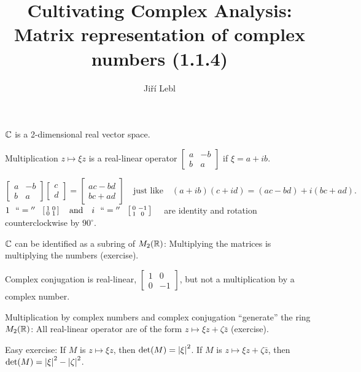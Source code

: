 \documentclass[10pt,aspectratio=169]{beamer}
\author{Ji\v{r}\'i Lebl}
\institute[OSU]{%
Departemento pri Matematiko de Oklahoma {\^S}tata Universitato}
\title{Cultivating Complex Analysis:\\%
Matrix representation of complex numbers (1.1.4)}
\date{}
\begin{document}
\begin{frame}
\titlepage
\end{frame}

\begin{frame}
${\mathbb{C}}$ is a 2-dimensional real vector space.

\pause
\medskip

Multiplication $z \mapsto \xi z$ is a real-linear operator
\(
\left[
\begin{smallmatrix}
a & -b \\
b & a
\end{smallmatrix}
\right]
\) if $\xi = a+ib$.

\pause
\[
\begin{bmatrix}
a & -b \\
b & a
\end{bmatrix}
\begin{bmatrix}
c \\
d 
\end{bmatrix}
=
\begin{bmatrix}
ac-bd \\
bc+ad
\end{bmatrix}
\quad
\text{just like}
\quad
(a+ib)(c+id) = (ac-bd) + i(bc+ad) .
\]
\pause
\medskip
$
1 ~~ ``{}={}'' ~~
\left[
\begin{smallmatrix}
1 & 0 \\
0 & 1
\end{smallmatrix}
\right]
\quad \text{and} \quad
i ~~ ``{}={}'' ~~ \left[
\begin{smallmatrix}
0 & -1 \\
1 & 0
\end{smallmatrix} 
\right]
\quad
$
are identity and rotation counterclockwise by $90^{\circ}$.

\pause
\medskip

${\mathbb{C}}$ can be identified as a subring of $M_2({\mathbb{R}})$: Multiplying the matrices
is multiplying the numbers (exercise).

\medskip
\pause

Complex conjugation is real-linear,
$\left[ \begin{smallmatrix} 1 & 0 \\ 0 &
-1 \end{smallmatrix} \right]$,
but not a multiplication by a complex number.

\pause
\medskip

Multiplication by complex numbers and complex conjugation ``generate''
the ring $M_2({\mathbb{R}})$:  All real-linear operator are of the form
$z \mapsto \xi z + \zeta \bar{z}$ (exercise).

\pause
\medskip

Easy exercise:
If $M$ is $z \mapsto \xi z$, then $\det(M) = \left\lvert {\xi} \right\rvert^2$.
If $M$ is $z \mapsto \xi z+ \zeta \bar{z}$, then $\det(M) =
\left\lvert {\xi} \right\rvert^2-\left\lvert {\zeta} \right\rvert^2$.

\end{frame}
\end{document}
